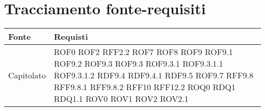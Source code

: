 \documentclass[../AnalisideiRequisiti.tex]{subfiles}
\begin{document}
	\section{Tracciamento fonte-requisiti}
	\begin{longtable}{| p{4cm} | p{4cm} |}
		\hline
		\textbf{Fonte} & \textbf{Requisti} \\
			\hline
		\endhead
		\newline Capitolato & \newline ROF0 \newline ROF2 \newline RFF2.2 \newline ROF7 \newline ROF8 \newline ROF9 \newline ROF9.1 \newline ROF9.2 \newline ROF9.3 \newline ROF9.3 \newline ROF9.3.1 \newline ROF9.3.1.1 \newline ROF9.3.1.2 \newline RDF9.4 \newline RDF9.4.1 \newline RDF9.5 \newline ROF9.7 \newline RFF9.8 \newline RFF9.8.1 \newline RFF9.8.2 \newline RFF10 \newline RFF12.2 \newline ROQ0 \newline RDQ1 \newline RDQ1.1 \newline ROV0 \newline ROV1 \newline ROV2 \newline ROV2.1 \\[1em]
	\hline	

\end{longtable}
\end{document}
